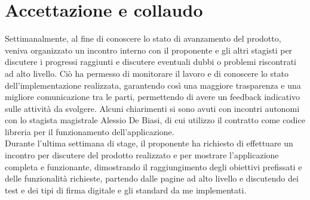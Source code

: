 \clearpage

\section{Accettazione e collaudo}\label{sec:verifica-validazione-accettazione}

Settimanalmente, al fine di conoscere lo stato di avanzamento del prodotto, veniva organizzato un incontro interno con
il proponente e gli altri stagisti per discutere i progressi raggiunti e discutere eventuali dubbi o problemi riscontrati ad alto livello.
Ciò ha permesso di monitorare il lavoro e di conoscere lo stato dell'implementazione realizzata, garantendo così una maggiore
trasparenza e una migliore comunicazione tra le parti, permettendo di avere un feedback indicativo sulle attività da svolgere.
Alcuni chiarimenti si sono avuti con incontri autonomi con lo stagista magistrale Alessio De Biasi, di cui utilizzo il contratto come codice libreria 
per il funzionamento dell'applicazione. \\

Durante l'ultima settimana di stage, il proponente ha richiesto di effettuare un incontro per discutere del prodotto realizzato e per
mostrare l'applicazione completa e funzionante, dimostrando il raggiungimento degli obiettivi prefissati e delle funzionalità richieste, 
partendo dalle pagine ad alto livello e discutendo dei test e dei tipi di firma digitale e gli standard da me implementati. 